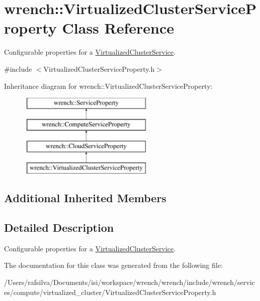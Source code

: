 \hypertarget{classwrench_1_1_virtualized_cluster_service_property}{}\section{wrench\+:\+:Virtualized\+Cluster\+Service\+Property Class Reference}
\label{classwrench_1_1_virtualized_cluster_service_property}


Configurable properties for a \hyperlink{classwrench_1_1_virtualized_cluster_service}{Virtualized\+Cluster\+Service}.  




{\ttfamily \#include $<$Virtualized\+Cluster\+Service\+Property.\+h$>$}

Inheritance diagram for wrench\+:\+:Virtualized\+Cluster\+Service\+Property\+:\begin{figure}[H]
\begin{center}
\leavevmode
\includegraphics[height=4.000000cm]{classwrench_1_1_virtualized_cluster_service_property}
\end{center}
\end{figure}
\subsection*{Additional Inherited Members}


\subsection{Detailed Description}
Configurable properties for a \hyperlink{classwrench_1_1_virtualized_cluster_service}{Virtualized\+Cluster\+Service}. 

The documentation for this class was generated from the following file\+:\begin{DoxyCompactItemize}
\item 
/\+Users/rafsilva/\+Documents/isi/workspace/wrench/wrench/include/wrench/services/compute/virtualized\+\_\+cluster/Virtualized\+Cluster\+Service\+Property.\+h\end{DoxyCompactItemize}
